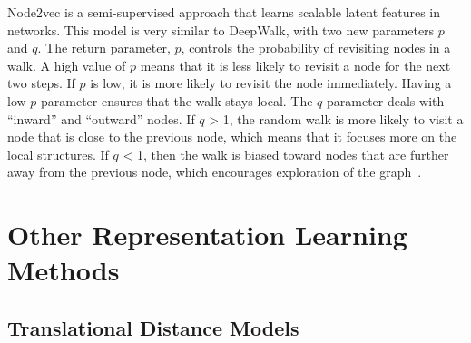 Node2vec is a semi-supervised approach that learns scalable latent features in networks.
This model is very similar to DeepWalk, with two new parameters $p$ and $q$.
The return parameter, $p$, controls the probability of revisiting nodes in a walk.
A high value of $p$ means that it is less likely to revisit a node for the next two steps.
If $p$ is low, it is more likely to revisit the node immediately.
Having a low $p$ parameter ensures that the walk stays local.
The $q$ parameter deals with “inward” and “outward” nodes.
If $q$ > 1, the random walk is more likely to visit a node that is close to the previous node, which means that it focuses more on the local structures.
If $q$ < 1, then the walk is biased toward nodes that are further away from the previous node, which encourages exploration of the graph~\cite{grover_node2vec:_2016}.

\begin{figure}[h!]
\end{figure}
\section{Other Representation Learning Methods}

\subsection{Translational Distance Models}

